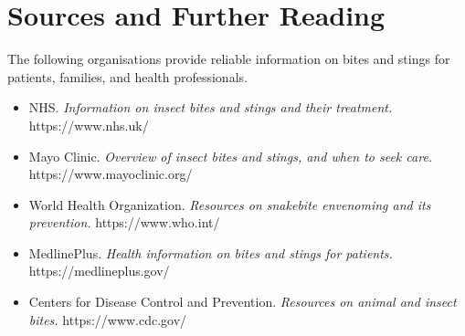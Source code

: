 \section*{Sources and Further Reading}
The following organisations provide reliable information on bites and stings for patients, families, and health professionals.

\begin{itemize}
    \item NHS. \textit{Information on insect bites and stings and their treatment.} https://www.nhs.uk/
    \item Mayo Clinic. \textit{Overview of insect bites and stings, and when to seek care.} https://www.mayoclinic.org/
    \item World Health Organization. \textit{Resources on snakebite envenoming and its prevention.} https://www.who.int/
    \item MedlinePlus. \textit{Health information on bites and stings for patients.} https://medlineplus.gov/
    \item Centers for Disease Control and Prevention. \textit{Resources on animal and insect bites.} https://www.cdc.gov/
\end{itemize}
